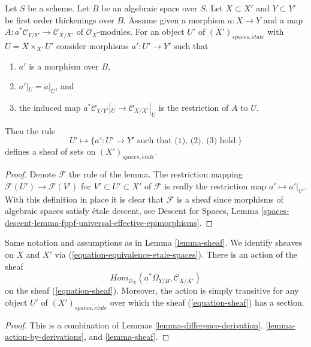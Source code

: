 \begin{lemma}
\label{lemma-sheaf}
Let $S$ be a scheme. Let $B$ be an algebraic space over $S$.
Let $X \subset X'$ and $Y \subset Y'$ be first order thickenings
over $B$. Assume given a morphism $a : X \to Y$ and a map
$A : a^*\mathcal{C}_{Y/Y'} \to \mathcal{C}_{X/X'}$ of
$\mathcal{O}_X$-modules. For an object $U'$ of
$(X')_{spaces, \acute{e}tale}$ with $U = X \times_{X'} U'$
consider morphisms $a' : U' \to Y'$ such that
\begin{enumerate}
\item $a'$ is a morphism over $B$,
\item $a'|_U = a|_U$, and
\item the induced map
$a^*\mathcal{C}_{Y/Y'}|_U \to \mathcal{C}_{X/X'}|_U$
is the restriction of $A$ to $U$.
\end{enumerate}
Then the rule
\begin{equation}
\label{equation-sheaf}
U' \mapsto
\{a' : U' \to Y'\text{ such that (1), (2), (3) hold.}\}
\end{equation}
defines a sheaf of sets on $(X')_{spaces, \acute{e}tale}$.
\end{lemma}

\begin{proof}
Denote $\mathcal{F}$ the rule of the lemma.
The restriction mapping $\mathcal{F}(U') \to \mathcal{F}(V')$ for
$V' \subset U' \subset X'$
of $\mathcal{F}$ is really the restriction map $a' \mapsto a'|_{V'}$.
With this definition in place it is clear that $\mathcal{F}$ is a
sheaf since morphisms of algebraic spaces satisfy \'etale descent, see
Descent for Spaces,
Lemma \ref{spaces-descent-lemma-fppf-universal-effective-epimorphisms}.
\end{proof}

\begin{lemma}
\label{lemma-action-sheaf}
Same notation and assumptions as in Lemma \ref{lemma-sheaf}.
We identify sheaves on $X$ and $X'$ via
(\ref{equation-equivalence-etale-spaces}). 
There is an action of the sheaf
$$
\textit{Hom}_{\mathcal{O}_X}(a^*\Omega_{Y/B}, \mathcal{C}_{X/X'})
$$
on the sheaf (\ref{equation-sheaf}). Moreover, the action
is simply transitive for any object $U'$ of $(X')_{spaces, \acute{e}tale}$
over which the sheaf (\ref{equation-sheaf}) has a section.
\end{lemma}

\begin{proof}
This is a combination of
Lemmas \ref{lemma-difference-derivation},
\ref{lemma-action-by-derivations},
and \ref{lemma-sheaf}.
\end{proof}

